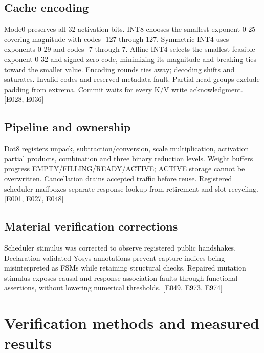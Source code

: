 \documentclass[11pt,a4paper]{article}
\begin{document}
\subsection{Cache encoding}

Mode0 preserves all 32 activation bits. INT8 chooses the smallest exponent 0-25 covering magnitude with codes -127 through 127. Symmetric INT4 uses exponents 0-29 and codes -7 through 7. Affine INT4 selects the smallest feasible exponent 0-32 and signed zero-code,\allowbreak{} minimizing its magnitude and breaking ties toward the smaller value. Encoding rounds ties away; decoding shifts and saturates. Invalid codes and reserved metadata fault. Partial head groups exclude padding from extrema. Commit waits for every K/\allowbreak{}V write acknowledgment. [\allowbreak{}E028,\allowbreak{} E036]\allowbreak{}

\subsection{Pipeline and ownership}

Dot8 registers unpack,\allowbreak{} subtraction/\allowbreak{}conversion,\allowbreak{} scale multiplication,\allowbreak{} activation partial products,\allowbreak{} combination and three binary reduction levels. Weight buffers progress EMPTY/\allowbreak{}FILLING/\allowbreak{}READY/\allowbreak{}ACTIVE; ACTIVE storage cannot be overwritten. Cancellation drains accepted traffic before reuse. Registered scheduler mailboxes separate response lookup from retirement and slot recycling. [\allowbreak{}E001,\allowbreak{} E027,\allowbreak{} E048]\allowbreak{}

\subsection{Material verification corrections}

Scheduler stimulus was corrected to observe registered public handshakes. Declaration-validated Yosys annotations prevent capture indices being misinterpreted as FSMs while retaining structural checks. Repaired mutation stimulus exposes causal and response-association faults through functional assertions,\allowbreak{} without lowering numerical thresholds. [\allowbreak{}E049,\allowbreak{} E973,\allowbreak{} E974]\allowbreak{}

\section{Verification methods and measured results}
\end{document}
